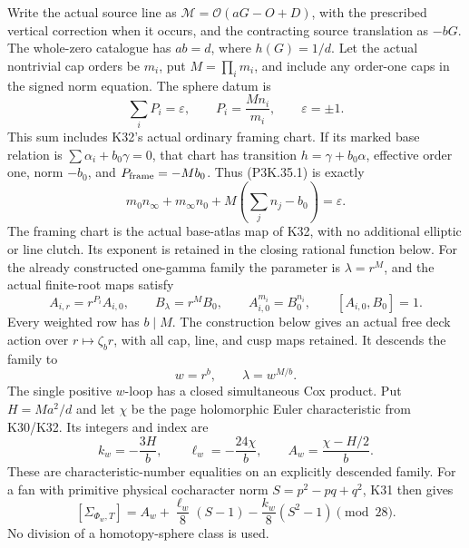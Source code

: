\begin{theorem}
Write the actual source line as
\(\mathcal M=\mathcal O(aG-O+D)\), with the prescribed vertical
correction when it occurs, and the contracting source translation as
\(-bG\). The whole-zero catalogue has \(ab=d\), where \(h(G)=1/d\).
Let the actual nontrivial cap orders be \(m_i\), put
\(M=\prod_i m_i\), and include any order-one caps in the signed
norm equation. The sphere datum is
\[
           \sum_i P_i=\varepsilon,\qquad
           P_i=\frac{M n_i}{m_i},\qquad \varepsilon=\pm1.
                                                               \tag{P3K.35.1}
\]
This sum includes K32's actual ordinary framing chart. If its marked
base relation is \(\sum\alpha_i+b_0\gamma=0\), that chart has
transition \(h=\gamma+b_0\alpha\), effective order one, norm
\(-b_0\), and \(P_{\rm frame}=-Mb_0\). Thus (P3K.35.1) is exactly
\[
 m_0n_\infty+m_\infty n_0
                +M\left(\sum_jn_j-b_0\right)=\varepsilon.
\]
The framing chart is the actual base-atlas map of K32, with no
additional elliptic or line clutch. Its exponent is retained in
the closing rational function below.
For the already constructed one-gamma family the parameter is
\(\lambda=r^M\), and the actual finite-root maps satisfy
\[
 A_{i,r}=r^{P_i}A_{i,0},\qquad B_\lambda=r^M B_0,
 \qquad A_{i,0}^{m_i}=B_0^{n_i},\qquad[A_{i,0},B_0]=1.
                                                               \tag{P3K.35.2}
\]
Every weighted row has \(b\mid M\). The construction below gives
an actual free deck action over \(r\mapsto\zeta_b r\), with all
cap, line, and cusp maps retained. It descends the family to
\[
                     w=r^b,\qquad \lambda=w^{M/b}.       \tag{P3K.35.3}
\]
The single positive \(w\)-loop has a closed simultaneous Cox product.
Put \(H=Ma^2/d\) and let \(\chi\) be the page holomorphic Euler
characteristic from K30/K32. Its integers and index are
\[
 k_w=-\frac{3H}{b},\qquad
 \ell_w=-\frac{24\chi}{b},\qquad
 A_w=\frac{\chi-H/2}{b}.                              \tag{P3K.35.4}
\]
These are characteristic-number equalities on an explicitly descended
family. For a fan with primitive physical cocharacter norm
\(S=p^2-pq+q^2\), K31 then gives
\[
 [\Sigma_{\Phi_w,T}]
      =A_w+\frac{\ell_w}{8}(S-1)
                   -\frac{k_w}{8}(S^2-1)\pmod {28}.     \tag{P3K.35.5}
\]
No division of a homotopy-sphere class is used.
\end{theorem}

